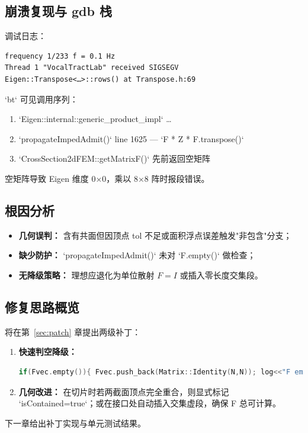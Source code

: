 \documentclass{ctexart}
\begin{document}
\subsection{崩溃复现与 gdb 栈}
调试日志：
\begin{verbatim}
frequency 1/233 f = 0.1 Hz
Thread 1 "VocalTractLab" received SIGSEGV
Eigen::Transpose<…>::rows() at Transpose.h:69
\end{verbatim}
`bt` 可见调用序列：
\begin{enumerate}
  \item `Eigen::internal::generic\_product\_impl` …
  \item `propagateImpedAdmit()` line 1625 — `F * Z * F.transpose()`
  \item `CrossSection2dFEM::getMatrixF()` 先前返回空矩阵
\end{enumerate}
空矩阵导致 Eigen 维度 0×0，乘以 8×8 阵时报段错误。

\subsection{根因分析}
\begin{itemize}
  \item \textbf{几何误判：} 含有共面但因顶点 tol 不足或面积浮点误差触发"非包含"分支；
  \item \textbf{缺少防护：} `propagateImpedAdmit()` 未对 `F.empty()` 做检查；
  \item \textbf{无降级策略：} 理想应退化为单位散射 $F=I$ 或插入零长度交集段。
\end{itemize}

\subsection{修复思路概览}
将在第~\ref{sec:patch} 章提出两级补丁：
\begin{enumerate}
  \item \textbf{快速判空降级：}
  \begin{lstlisting}[language=C++]
if(Fvec.empty()){ Fvec.push_back(Matrix::Identity(N,N)); log<<"F empty – use I"; }
  \end{lstlisting}
  \item \textbf{几何改进：} 在切片时若两截面顶点完全重合，则显式标记 `isContained=true`；或在接口处自动插入交集虚段，确保 F 总可计算。
\end{enumerate}

\vspace{0.5em}
下一章给出补丁实现与单元测试结果。
\end{document}
